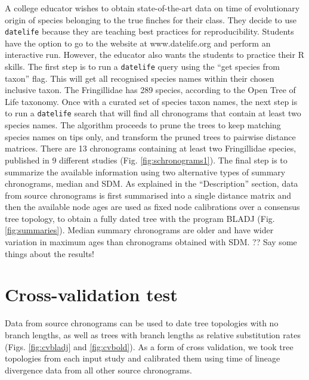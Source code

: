 \documentclass[
  english,
  man]{apa6}
\begin{document}
A college educator wishes to obtain state-of-the-art data on time of evolutionary origin of species belonging to the true finches for their class. They decide to use \texttt{datelife} because they are teaching best practices for reproducibility.
Students have the option to go to the website at www.datelife.org and perform an interactive run. However, the educator also wants the students to practice their R skills.
The first step is to run a \texttt{datelife} query using the ``get species from taxon'' flag. This will get all recognised species names within their chosen inclusive taxon. The Fringillidae has 289 species, according to the Open Tree of Life taxonomy.
Once with a curated set of species taxon names, the next step is to run a \texttt{datelife} search that will find all chronograms that contain at least two species names. The algorithm proceeds to prune the trees to keep matching species names on tips only, and transform the pruned trees to pairwise distance matrices.
There are 13 chronograms containing at least two Fringillidae species, published in 9 different studies (Fig. \ref{fig:schronograms1}).
The final step is to summarize the available information using two alternative types of summary chronograms, median and SDM. As explained in the ``Description'' section, data from source chronograms is first summarised into a single distance matrix and then the available node ages are used as fixed node calibrations over a consensus tree topology, to obtain a fully dated tree with the program BLADJ (Fig. \ref{fig:summaries}). Median summary chronograms are older and have wider variation in maximum ages than chronograms obtained with SDM.
?? Say some things about the results!

\hypertarget{cross-validation-test}{%
\section{Cross-validation test}\label{cross-validation-test}}

Data from source chronograms can be used to date tree topologies with no branch lengths, as well as trees with branch lengths as relative substitution rates (Figs. \ref{fig:cvbladj} and \ref{fig:cvbold}). As a form of cross validation, we took tree topologies from each input study and calibrated them using time of lineage divergence data from all other source chronograms.
\end{document}
